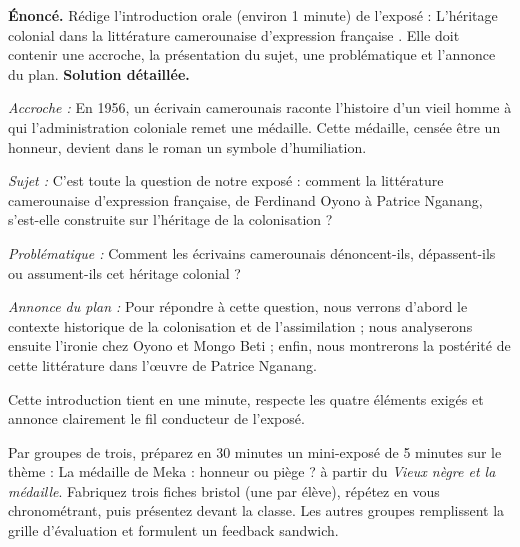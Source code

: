 \documentclass[11pt]{article}
\begin{document}
\begin{exoresolu}
\textbf{Énoncé.} Rédige l'introduction orale (environ 1 minute) de l'exposé : \og L'héritage colonial dans la littérature camerounaise d'expression française \fg{}. Elle doit contenir une accroche, la présentation du sujet, une problématique et l'annonce du plan.
\tcblower
\textbf{Solution détaillée.}\par
\emph{Accroche :} \og En 1956, un écrivain camerounais raconte l'histoire d'un vieil homme à qui l'administration coloniale remet une médaille. Cette médaille, censée être un honneur, devient dans le roman un symbole d'humiliation. \fg{}\par
\emph{Sujet :} \og C'est toute la question de notre exposé : comment la littérature camerounaise d'expression française, de Ferdinand Oyono à Patrice Nganang, s'est-elle construite sur l'héritage de la colonisation ? \fg{}\par
\emph{Problématique :} \og Comment les écrivains camerounais dénoncent-ils, dépassent-ils ou assument-ils cet héritage colonial ? \fg{}\par
\emph{Annonce du plan :} \og Pour répondre à cette question, nous verrons d'abord le contexte historique de la colonisation et de l'assimilation ; nous analyserons ensuite l'ironie chez Oyono et Mongo Beti ; enfin, nous montrerons la postérité de cette littérature dans l'œuvre de Patrice Nganang. \fg{}\par
Cette introduction tient en une minute, respecte les quatre éléments exigés et annonce clairement le fil conducteur de l'exposé.
\end{exoresolu}

\begin{exercice}
Par groupes de trois, préparez en 30 minutes un mini-exposé de 5 minutes sur le thème : \og La médaille de Meka : honneur ou piège ? \fg{} à partir du \emph{Vieux nègre et la médaille}. Fabriquez trois fiches bristol (une par élève), répétez en vous chronométrant, puis présentez devant la classe. Les autres groupes remplissent la grille d'évaluation et formulent un feedback sandwich.
\end{exercice}
\end{document}
